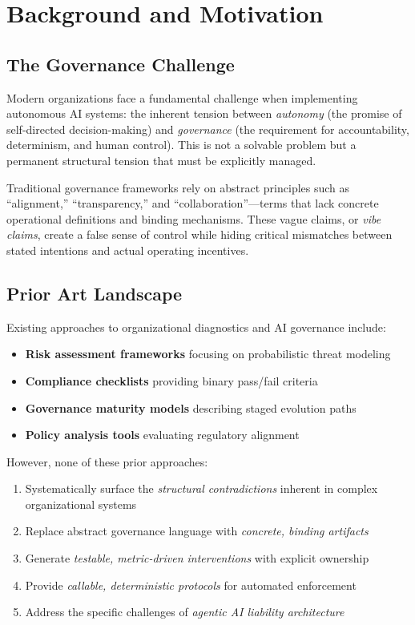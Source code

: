 \documentclass[11pt,a4paper]{article}
\begin{document}
\section{Background and Motivation}

\subsection{The Governance Challenge}

Modern organizations face a fundamental challenge when implementing autonomous AI systems: the inherent tension between \textit{autonomy} (the promise of self-directed decision-making) and \textit{governance} (the requirement for accountability, determinism, and human control). This is not a solvable problem but a permanent structural tension that must be explicitly managed.

Traditional governance frameworks rely on abstract principles such as ``alignment,'' ``transparency,'' and ``collaboration''—terms that lack concrete operational definitions and binding mechanisms. These vague claims, or \textit{vibe claims}, create a false sense of control while hiding critical mismatches between stated intentions and actual operating incentives.

\subsection{Prior Art Landscape}

Existing approaches to organizational diagnostics and AI governance include:

\begin{itemize}
\item \textbf{Risk assessment frameworks} focusing on probabilistic threat modeling
\item \textbf{Compliance checklists} providing binary pass/fail criteria
\item \textbf{Governance maturity models} describing staged evolution paths
\item \textbf{Policy analysis tools} evaluating regulatory alignment
\end{itemize}

However, none of these prior approaches:

\begin{enumerate}
\item Systematically surface the \textit{structural contradictions} inherent in complex organizational systems
\item Replace abstract governance language with \textit{concrete, binding artifacts}
\item Generate \textit{testable, metric-driven interventions} with explicit ownership
\item Provide \textit{callable, deterministic protocols} for automated enforcement
\item Address the specific challenges of \textit{agentic AI liability architecture}
\end{enumerate}
\end{document}
